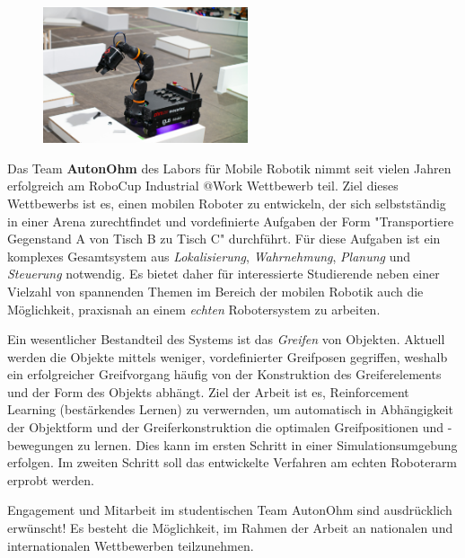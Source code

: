 \documentclass{ohm_project_description}
\begin{document}
\maketitle
\thispagestyle{fancy}

\vspace*{-2.5cm}
\begin{figure}[h!]
    \centering
    \includegraphics[height=4cm]{img/atwork.jpg}
\end{figure} 


Das Team \textbf{AutonOhm} des Labors für Mobile Robotik nimmt seit vielen Jahren erfolgreich am RoboCup Industrial @Work Wettbewerb teil. Ziel dieses Wettbewerbs ist es, einen mobilen Roboter zu entwickeln, der sich selbstständig in einer Arena zurechtfindet und vordefinierte Aufgaben der Form "Transportiere Gegenstand A von Tisch B zu Tisch C" durchführt. Für diese Aufgaben ist ein komplexes Gesamtsystem aus \emph{Lokalisierung}, \emph{Wahrnehmung}, \emph{Planung} und \emph{Steuerung} notwendig. Es bietet daher für interessierte Studierende neben einer Vielzahl von spannenden Themen im Bereich der mobilen Robotik auch die Möglichkeit, praxisnah an einem \emph{echten} Robotersystem zu arbeiten.

Ein wesentlicher Bestandteil des Systems ist das \emph{Greifen} von Objekten. Aktuell werden die Objekte mittels weniger, vordefinierter Greifposen gegriffen, weshalb ein erfolgreicher Greifvorgang häufig von der Konstruktion des Greiferelements und der Form des Objekts abhängt. Ziel der Arbeit ist es, Reinforcement Learning (bestärkendes Lernen) zu verwernden, um automatisch in Abhängigkeit der Objektform und der Greiferkonstruktion die optimalen Greifpositionen und -bewegungen zu lernen. Dies kann im ersten Schritt in einer Simulationsumgebung erfolgen. Im zweiten Schritt soll das entwickelte Verfahren am echten Roboterarm erprobt werden. 

Engagement und Mitarbeit im studentischen Team AutonOhm sind ausdrücklich erwünscht! Es besteht die Möglichkeit, im Rahmen der Arbeit an nationalen und internationalen Wettbewerben teilzunehmen.
\end{document}
